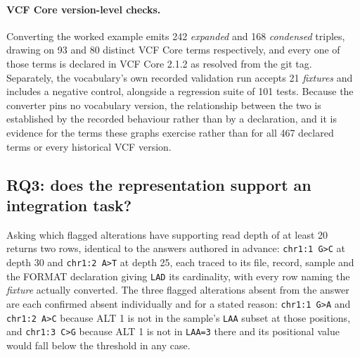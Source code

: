 \paragraph{VCF Core version-level checks.}
Converting the worked example emits 242 \textit{expanded} and 168 \textit{condensed} triples, drawing on 93 and 80 distinct VCF Core terms respectively, and every one of those terms is declared in VCF Core 2.1.2 as resolved from the git tag.
Separately, the vocabulary's own recorded validation run accepts 21 \emph{fixtures} and includes a negative control, alongside a regression suite of 101 tests.
Because the converter pins no vocabulary version, the relationship between the two is established by the recorded behaviour rather than by a declaration, and it is evidence for the terms these graphs exercise rather than for all 467 declared terms or every historical VCF version.

\subsection{RQ3: does the representation support an integration task?}
\label{sec:integration}

Asking which flagged alterations have supporting read depth of at least 20 returns two rows, identical to the answers authored in advance: \texttt{chr1:1~G>C} at depth 30 and \texttt{chr1:2~A>T} at depth 25, each traced to its file, record, sample and the FORMAT declaration giving \texttt{LAD} its cardinality, with every row naming the \emph{fixture} actually converted.
The three flagged alterations absent from the answer are each confirmed absent individually and for a stated reason: \texttt{chr1:1~G>A} and \texttt{chr1:2~A>C} because ALT 1 is not in the sample's \texttt{LAA} subset at those positions, and \texttt{chr1:3~C>G} because ALT 1 is not in \texttt{LAA=3} there and its positional value would fall below the threshold in any case.


